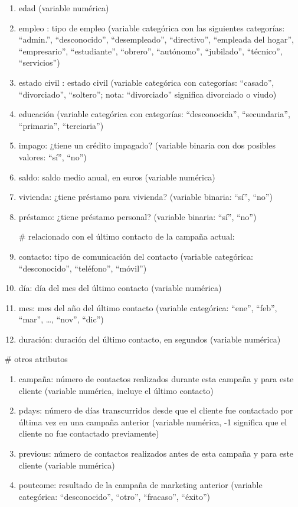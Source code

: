 \documentclass[
  letterpaper,
  DIV=11,
  numbers=noendperiod]{scrreprt}
\begin{document}
\begin{enumerate}
\def\labelenumi{\arabic{enumi}.}
\item
  edad (variable numérica)
\item
  empleo : tipo de empleo (variable categórica con las siguientes
  categorías: ``admin.'', ``desconocido'', ``desempleado'',
  ``directivo'', ``empleada del hogar'', ``empresario'', ``estudiante'',
  ``obrero'', ``autónomo'', ``jubilado'', ``técnico'', ``servicios'')
\item
  estado civil : estado civil (variable categórica con categorías:
  ``casado'', ``divorciado'', ``soltero''; nota: ``divorciado''
  significa divorciado o viudo)
\item
  educación (variable categórica con categorías: ``desconocida'',
  ``secundaria'', ``primaria'', ``terciaria'')
\item
  impago: ¿tiene un crédito impagado? (variable binaria con dos posibles
  valores: ``sí'', ``no'')
\item
  saldo: saldo medio anual, en euros (variable numérica)
\item
  vivienda: ¿tiene préstamo para vivienda? (variable binaria: ``sí'',
  ``no'')
\item
  préstamo: ¿tiene préstamo personal? (variable binaria: ``sí'', ``no'')

  \# relacionado con el último contacto de la campaña actual:
\item
  contacto: tipo de comunicación del contacto (variable categórica:
  ``desconocido'', ``teléfono'', ``móvil'')
\item
  día: día del mes del último contacto (variable numérica)
\item
  mes: mes del año del último contacto (variable categórica: ``ene'',
  ``feb'', ``mar'', \ldots, ``nov'', ``dic'')
\item
  duración: duración del último contacto, en segundos (variable
  numérica)
\end{enumerate}

\# otros atributos

\begin{enumerate}
\def\labelenumi{\arabic{enumi}.}
\setcounter{enumi}{12}
\item
  campaña: número de contactos realizados durante esta campaña y para
  este cliente (variable numérica, incluye el último contacto)
\item
  pdays: número de días transcurridos desde que el cliente fue
  contactado por última vez en una campaña anterior (variable numérica,
  -1 significa que el cliente no fue contactado previamente)
\item
  previous: número de contactos realizados antes de esta campaña y para
  este cliente (variable numérica)
\item
  poutcome: resultado de la campaña de marketing anterior (variable
  categórica: ``desconocido'', ``otro'', ``fracaso'', ``éxito'')
\end{enumerate}
\end{document}
